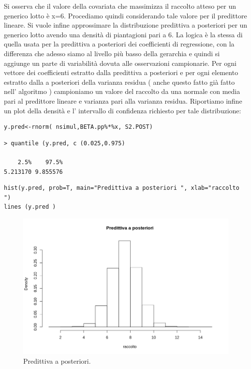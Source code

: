 Si osserva che il valore della covariata che massimizza il raccolto atteso per un 
generico lotto è x=6. Procediamo quindi considerando tale valore per il predittore 
lineare. Si vuole infine approssimare la distribuzione predittiva a posteriori per 
un generico lotto avendo una densità di piantagioni pari a 6. La logica è la stessa 
di quella usata per la predittiva a posteriori dei coefficienti di regressione, con 
la differenza che adesso siamo al livello più basso della gerarchia e quindi si 
aggiunge un parte di variabilità dovuta alle osservazioni campionarie. 
Per ogni vettore dei coefficienti estratto dalla predittiva a posteriori e per ogni 
elemento estratto dalla a posteriori della varianza residua ( anche questo fatto già 
fatto nell' algoritmo ) campioniamo un valore del raccolto da una normale con 
media pari al predittore lineare e varianza pari alla varianza residua. 
Riportiamo infine un plot della densità e l' intervallo di confidenza richiesto per 
tale distribuzione:

\begin{lstlisting}[style=R]
y.pred<-rnorm( nsimul,BETA.pp%*%x, S2.POST)
\end{lstlisting}

{
\color{red}
\begin{Verbatim}
> quantile (y.pred, c (0.025,0.975) 

    2.5%    97.5%
5.213170 9.855576
\end{Verbatim}
}

\begin{lstlisting}[style=R]
hist(y.pred, prob=T, main="Predittiva a posteriori ", xlab="raccolto ")
lines (y.pred )
\end{lstlisting}

\begin{figure}
    \centering
    \includegraphics[totalheight=10cm]{img/esercizio11-2-6.png}
    \caption{   Predittiva a posteriori.}
\end{figure}